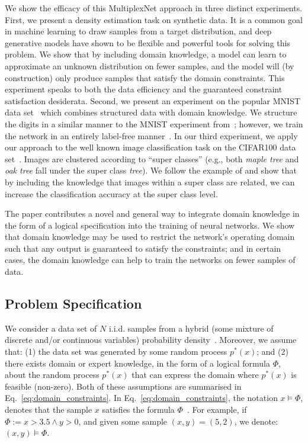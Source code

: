 \documentclass[letterpaper]{article} %
\begin{document}
We  show the efficacy of this {MultiplexNet} approach in three distinct experiments.
First, we present a density estimation task on synthetic data.
It is a common goal in machine learning to draw samples from a target distribution, and deep generative models have shown to be flexible and powerful tools for solving this problem.
We show that by including domain knowledge, a model can learn to approximate an unknown distribution on fewer samples, and the model will (by construction) only produce samples that satisfy the domain constraints.
This experiment speaks to both the data efficiency and the guaranteed constraint satisfaction desiderata.
Second, we present an experiment on the popular MNIST data set~\citep{lecun2010mnist} which combines structured data with domain knowledge.
We structure the digits in a similar manner to the MNIST experiment from~\citet{manhaeve2018deepproblog}; however, we train the network in an entirely label-free manner~\citep{stewart2017label}.
In our third experiment, we apply our approach to the well known image classification task on the CIFAR100 data set~\citep{krizhevsky2009learning}.
Images are clustered according to ``super classes'' (e.g., both \textit{maple tree} and \textit{oak tree} fall under the super class \textit{tree}).
We follow the example of \citet{fischer2018dl2} and show that by including the knowledge that images within a super class are related, we can increase the classification accuracy at the super class level.

The paper contributes a novel and general way to integrate domain knowledge in the form of a logical specification into the training of neural networks.
We show that domain knowledge may be used to restrict the network's operating domain such that any output is guaranteed to satisfy the constraints; and in certain cases, the domain knowledge can help to train the networks on fewer samples of data.


\subsection{Problem Specification}
We consider a data set of $N$ i.i.d. samples from a hybrid (some mixture of discrete and/or continuous variables) probability density~\citep{belle2015probabilistic}.
Moreover, we assume that: (1) the data set was generated by some random process $p^*(x)$; and (2) there exists domain or expert knowledge, in the form of a logical formula $\Phi$, about the random process $p^*(x)$ that can express the domain where $p^*(x)$ is feasible (non-zero).
Both of these assumptions are summarised in Eq.~\ref{eq:domain_constraints}.
In Eq.~\ref{eq:domain_constraints}, the notation $x \models \Phi$, denotes that the sample $x$ satisfies the formula $\Phi$~\citep{barrett2009handbook}.
For example, if $\Phi := x > 3.5 \land y > 0$, and given some sample $(x, y) = (5, 2)$, we denote: $(x, y) \models \Phi$.
\end{document}
